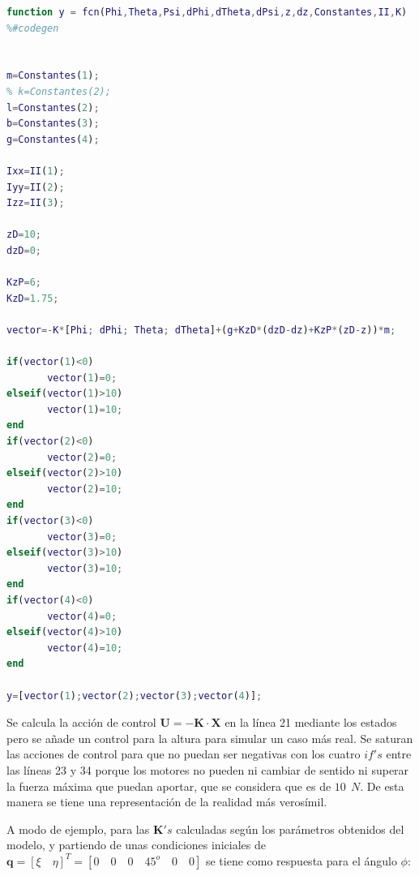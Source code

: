 \documentclass[twoside,11pt]{book}
\begin{document}
\begin{lstlisting}[language=Matlab]
function y = fcn(Phi,Theta,Psi,dPhi,dTheta,dPsi,z,dz,Constantes,II,K)
%#codegen


m=Constantes(1);
% k=Constantes(2);
l=Constantes(2);
b=Constantes(3);
g=Constantes(4);

Ixx=II(1);
Iyy=II(2);
Izz=II(3);

zD=10;
dzD=0;

KzP=6;
KzD=1.75;

vector=-K*[Phi; dPhi; Theta; dTheta]+(g+KzD*(dzD-dz)+KzP*(zD-z))*m;

if(vector(1)<0) 
       vector(1)=0;
elseif(vector(1)>10)
       vector(1)=10;
end
if(vector(2)<0) 
       vector(2)=0;
elseif(vector(2)>10)
       vector(2)=10;       
end
if(vector(3)<0) 
       vector(3)=0;
elseif(vector(3)>10)
       vector(3)=10;       
end
if(vector(4)<0) 
       vector(4)=0;       
elseif(vector(4)>10)
       vector(4)=10;       
end
 
y=[vector(1);vector(2);vector(3);vector(4)];
\end{lstlisting}

Se calcula la acción de control $\mathbf{U}=-\mathbf{K} \cdot \mathbf{X}$ en la línea 21 mediante los estados pero se añade un control para la altura para simular un caso más real. Se saturan las acciones de control para que no puedan ser negativas con los cuatro $if's$ entre las líneas 23 y 34 porque los motores no pueden ni cambiar de sentido ni superar la fuerza máxima que puedan aportar, que se considera que es de $10\>\>N$. De esta manera se tiene una representación de la realidad más verosímil. 

A modo de ejemplo, para las $\mathbf{K}'s$ calculadas según los parámetros obtenidos del modelo,
y partiendo de unas condiciones iniciales de $\mathbf{q}=[\xi \quad \eta]^{T}=[0 \quad 0 \quad 0 \quad 45^{o} \quad 0 \quad 0 ]$ se tiene como respuesta para el ángulo $\phi$: 
\end{document}
